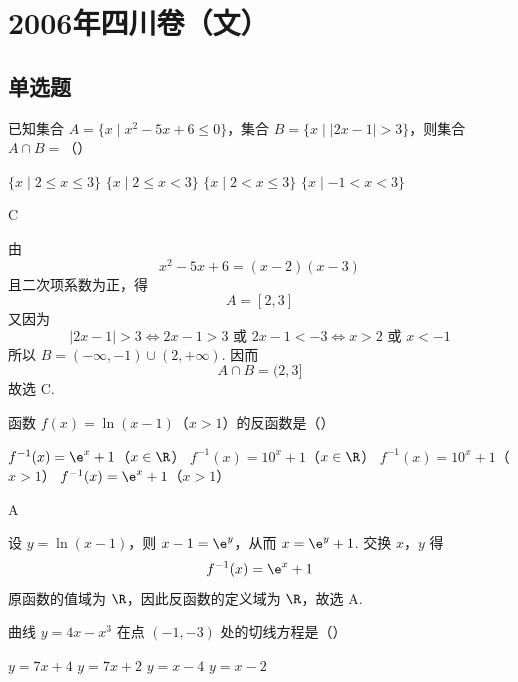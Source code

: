 \chapter{2006年四川卷（文）}
\section{单选题}
\begin{problem}
已知集合 \(A = \{x \mid x^2 - 5x + 6 \leqslant 0\}\)，集合 \(B = \{x \mid |2x - 1| > 3\}\)，则集合 \(A \cap B =\)（\quad）

\choices
    {\(\{x\mid 2\leqslant x\leqslant 3\}\)}
    {\(\{x\mid 2\leqslant x < 3\}\)}
    {\(\{x\mid 2 < x\leqslant 3\}\)}
    {\(\{x\mid -1 < x < 3\}\)}
\end{problem}

\begin{answer}
C
\end{answer}

\begin{solution}
由
\[
x^2-5x+6=(x-2)(x-3)
\]
且二次项系数为正，得
\[
A=\left[2,3\right]
\]
又因为
\[
\left|2x-1\right|>3
\Longleftrightarrow 2x-1>3\text{ 或 }2x-1<-3
\Longleftrightarrow x>2\text{ 或 }x<-1
\]
所以 \(B=(-\infty,-1)\cup(2,+\infty)\). 因而
\[
A\cap B=(2,3]
\]
故选 C.
\end{solution}

\begin{problem}
函数 \(f(x) = \ln(x - 1)\)（\(x > 1\)）的反函数是（\quad）

\choices
    {\(f^{-1}(x) = \e^{x} + 1\)（\(x\in \R\)）}
    {\(f^{-1}(x) = 10^{x} + 1\)（\(x\in \R\)）}
    {\(f^{-1}(x) = 10^{x} + 1\)（\(x > 1\)）}
    {\(f^{-1}(x) = \e^{x} + 1\)（\(x > 1\)）}
\end{problem}

\begin{answer}
A
\end{answer}

\begin{solution}
设 \(y=\ln(x-1)\)，则 \(x-1=\e^y\)，从而 \(x=\e^y+1\). 交换 \(x\)，\(y\) 得
\[
f^{-1}(x)=\e^x+1
\]
原函数的值域为 \(\R\)，因此反函数的定义域为 \(\R\)，故选 A.
\end{solution}

\begin{problem}
曲线 \( y = 4x - x^3 \) 在点 \((-1, -3)\) 处的切线方程是（\quad）

\choices
    {\(y = 7x + 4\)}
    {\(y = 7x + 2\)}
    {\(y = x - 4\)}
    {\(y = x - 2\)}
\end{problem}

